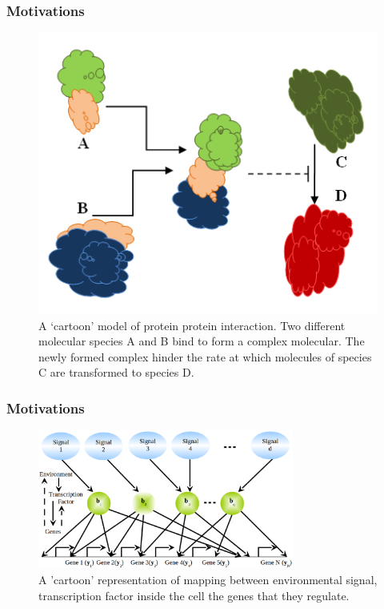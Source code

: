 \documentclass{beamer}
\begin{document}
\begin{frame}
\frametitle{Motivations}

\begin{figure}[t]
	\centering
		\includegraphics[scale=.35]{diagrams/ProtienProtien.png}
		\caption{A ‘cartoon’ model of protein protein interaction. Two different molecular species A and B bind to
		 form a complex molecular. The newly formed complex hinder the rate at which molecules of species 
		 C are transformed to species D.}
	\label{fig:Protein protein interaction}
\end{figure}


\end{frame}

\begin{frame}
\frametitle{Motivations}
\begin{figure}[t]
	\centering
		\includegraphics[width=0.75\textwidth,keepaspectratio]{diagrams/MappingEnvironmentalSignal.eps}
		\caption[The mapping between environmental signal, transcription factor inside 			the cell the genes that they regulate]{A 'cartoon' representation of mapping between environmental signal, transcription factor inside the cell the genes that they regulate.}
	\label{fig:MappingEnvironmentalSignal}
\end{figure}
\end{frame}
\end{document}
